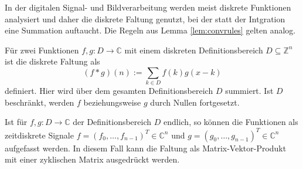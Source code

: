 
In der digitalen Signal- und Bildverarbeitung werden meist diskrete Funktionen analysiert und daher die diskrete Faltung genutzt, bei der statt der Intgration eine Summation auftaucht. Die Regeln aus Lemma \ref{lem:convrules} gelten analog.

\begin{defi}\label{disk_faltung}
    Für zwei Funktionen $f,g: D \rightarrow \mathbb{C}$ mit einem diskreten Definitionsbereich $D \subseteq \mathbb{Z}^n$ ist die diskrete Faltung als
    \begin{equation*}
        (f \ast g) (n) := \sum_{k \in D} f(k) g(x-k)
    \end{equation*}
    definiert. Hier wird über dem gesamten Definitionsbereich $D$ summiert. Ist $D$ beschränkt, werden $f$ beziehungsweise $g$ durch Nullen fortgesetzt.  
\end{defi}

Ist für $f,g: D \rightarrow \mathbb{C}$ der Definitionsbereich $D$ endlich, so können die Funktionen als zeitdiskrete Signale $f=(f_0, \ldots, f_{n-1})^T \in \mathbb{C}^{n}$ und $g=(g_0, \ldots, g_{n-1})^T \in \mathbb{C}^{n}$ aufgefasst werden. %
In diesem Fall kann die Faltung als Matrix-Vektor-Produkt mit einer zyklischen Matrix ausgedrückt werden. 

